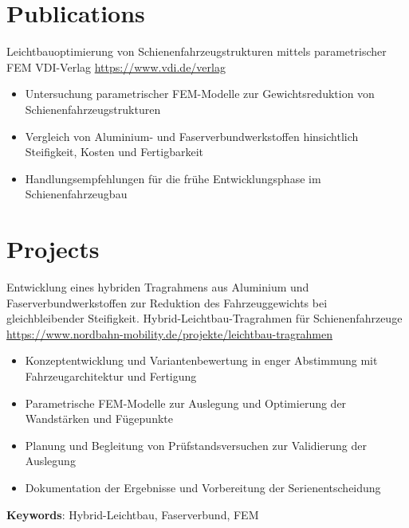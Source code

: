 \documentclass[a4paper, serif, 10pt]{moderncv}
\begin{document}
\section{Publications}

        {Leichtbauoptimierung von Schienenfahrzeugstrukturen mittels parametrischer FEM}
        {VDI-Verlag}
        {\url{https://www.vdi.de/verlag}}
        {}
        {\begin{itemize}
\item Untersuchung parametrischer FEM-Modelle zur Gewichtsreduktion von Schienenfahrzeugstrukturen
\item Vergleich von Aluminium- und Faserverbundwerkstoffen hinsichtlich Steifigkeit, Kosten und Fertigbarkeit
\item Handlungsempfehlungen für die frühe Entwicklungsphase im Schienenfahrzeugbau
\end{itemize}}
\section{Projects}

        {Entwicklung eines hybriden Tragrahmens aus Aluminium und Faserverbundwerkstoffen zur Reduktion des Fahrzeuggewichts bei gleichbleibender Steifigkeit.}
        {Hybrid-Leichtbau-Tragrahmen für Schienenfahrzeuge}
        {\url{https://www.nordbahn-mobility.de/projekte/leichtbau-tragrahmen}}
        {}
        {\begin{itemize}
\item Konzeptentwicklung und Variantenbewertung in enger Abstimmung mit Fahrzeugarchitektur und Fertigung
\item Parametrische FEM-Modelle zur Auslegung und Optimierung der Wandstärken und Fügepunkte
\item Planung und Begleitung von Prüfstandsversuchen zur Validierung der Auslegung
\item Dokumentation der Ergebnisse und Vorbereitung der Serienentscheidung
\end{itemize}
\textbf{Keywords}: Hybrid-Leichtbau, Faserverbund, FEM}
\end{document}
